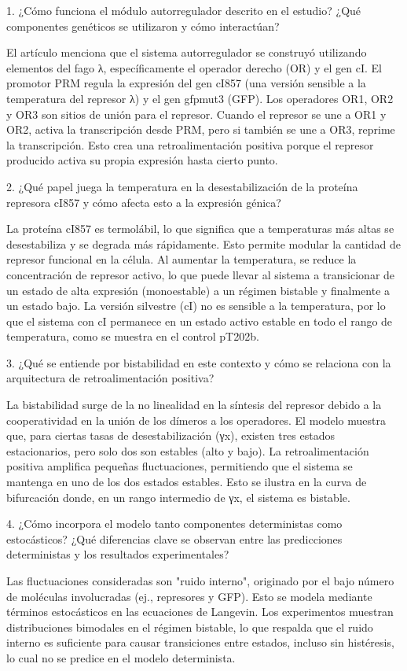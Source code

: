 1. ¿Cómo funciona el módulo autorregulador descrito en el estudio? ¿Qué componentes genéticos se utilizaron y cómo interactúan?

El artículo menciona que el sistema autorregulador se construyó utilizando elementos del fago λ, específicamente el operador derecho (OR) y el gen cI. El promotor PRM regula la expresión del gen cI857 (una versión sensible a la temperatura del represor λ) y el gen gfpmut3 (GFP). Los operadores OR1, OR2 y OR3 son sitios de unión para el represor. Cuando el represor se une a OR1 y OR2, activa la transcripción desde PRM, pero si también se une a OR3, reprime la transcripción. Esto crea una retroalimentación positiva porque el represor producido activa su propia expresión hasta cierto punto.

2. ¿Qué papel juega la temperatura en la desestabilización de la proteína represora cI857 y cómo afecta esto a la expresión génica?

La proteína cI857 es termolábil, lo que significa que a temperaturas más altas se desestabiliza y se degrada más rápidamente. Esto permite modular la cantidad de represor funcional en la célula. Al aumentar la temperatura, se reduce la concentración de represor activo, lo que puede llevar al sistema a transicionar de un estado de alta expresión (monoestable) a un régimen bistable y finalmente a un estado bajo. La versión silvestre (cI) no es sensible a la temperatura, por lo que el sistema con cI permanece en un estado activo estable en todo el rango de temperatura, como se muestra en el control pT202b.

3. ¿Qué se entiende por bistabilidad en este contexto y cómo se relaciona con la arquitectura de retroalimentación positiva?

La bistabilidad surge de la no linealidad en la síntesis del represor debido a la cooperatividad en la unión de los dímeros a los operadores. El modelo muestra que, para ciertas tasas de desestabilización (γx), existen tres estados estacionarios, pero solo dos son estables (alto y bajo). La retroalimentación positiva amplifica pequeñas fluctuaciones, permitiendo que el sistema se mantenga en uno de los dos estados estables. Esto se ilustra en la curva de bifurcación donde, en un rango intermedio de γx, el sistema es bistable.

4. ¿Cómo incorpora el modelo tanto componentes deterministas como estocásticos? ¿Qué diferencias clave se observan entre las predicciones deterministas y los resultados experimentales?

Las fluctuaciones consideradas son "ruido interno", originado por el bajo número de moléculas involucradas (ej., represores y GFP). Esto se modela mediante términos estocásticos en las ecuaciones de Langevin. Los experimentos muestran distribuciones bimodales en el régimen bistable, lo que respalda que el ruido interno es suficiente para causar transiciones entre estados, incluso sin histéresis, lo cual no se predice en el modelo determinista.


